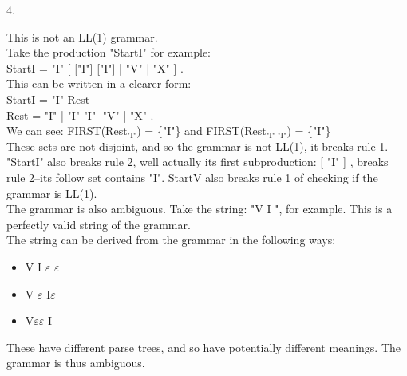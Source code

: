 \documentclass[a4paper,12pt]{article}
\newcommand\block[1]{\hspace*{#1}}
\begin{document}
4.
\begin{minipage}[t]{0.95\dimexpr\textwidth}
  This is not an LL(1) grammar.\\
  Take the production "StartI" for example:\\

  \block{1cm} StartI = "I" [ ["I"] ["I"] | "V" | "X" ] .\\
    
  This can be written in a clearer form:\\

  \block{1cm} StartI = "I" Rest\\
  \block{1cm} Rest = "I" | "I" "I" |"V" | "X"  .\\

  We can see: FIRST(Rest$_{\text{"I"}}$) = \{"I"\} and FIRST(Rest$_{\text{"I" "I"}}$) = \{"I"\}\\
  These sets are not disjoint, and so the grammar is not LL(1), it breaks rule 1.\\
  "StartI" also breaks rule 2, well actually its first subproduction: [ "I" ] , breaks rule 2--its follow set contains "I".
  StartV also breaks rule 1 of checking if the grammar is LL(1).\\

  The grammar is also ambiguous.
  Take the string: "V I ", for example. This is a perfectly valid string of the grammar.\\
  The string can be derived from the grammar in the following ways:
  \begin{itemize}
    \item V I $\varepsilon$ $\varepsilon$
    \item V $\varepsilon$ I$\varepsilon$
    \item V$\varepsilon\varepsilon$ I
  \end{itemize} 
  These have different parse trees, and so have potentially different meanings.
  The grammar is thus ambiguous.
\end{minipage}
\end{document}
